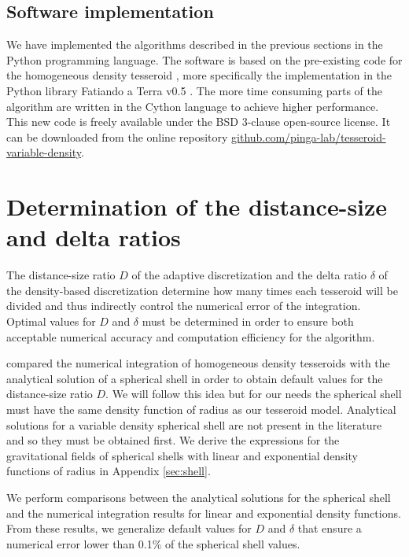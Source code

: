 \documentclass[extra, referee]{gji}
\begin{document}
\subsection{Software implementation}

We have implemented the algorithms described in the previous sections in the Python
programming language.
The software is based on the pre-existing code for the homogeneous density tesseroid
\citep{Uieda2016}, more specifically the implementation in the Python library Fatiando a
Terra v0.5 \citep{Uieda2013}.
The more time consuming parts of the algorithm are written in the Cython language to
achieve higher performance.
This new code is freely available under the BSD 3-clause open-source license.
It can be downloaded from the online repository
\href{https://github.com/pinga-lab/tesseroid-variable-density}{github.com/pinga-lab/tesseroid-variable-density}.




\section{Determination of the distance-size and delta ratios}

The distance-size ratio $D$ of the adaptive discretization and the delta ratio $\delta$
of the density-based discretization determine how many times each tesseroid will be
divided and thus indirectly control the numerical error of the integration.
Optimal values for $D$ and $\delta$ must be determined in order to ensure both
acceptable numerical accuracy and computation efficiency for the algorithm.

\citet{Uieda2016} compared the numerical integration of homogeneous density tesseroids
with the analytical solution of a spherical shell \citep{Mikuska2006,Grombein2013} in
order to obtain default values for the distance-size ratio $D$.
We will follow this idea but for our needs the spherical shell must
have the same density function of radius as our tesseroid model.
Analytical solutions for a variable density spherical shell are not present in the
literature and so they must be obtained first.
We derive the expressions for the gravitational fields of spherical shells with linear
and exponential density functions of radius in Appendix \ref{sec:shell}.

We perform comparisons between the analytical solutions for the spherical shell and the
numerical integration results for linear and exponential density functions.
From these results, we generalize default values for $D$ and $\delta$ that ensure a
numerical error lower than 0.1\% of the spherical shell values.
\end{document}
